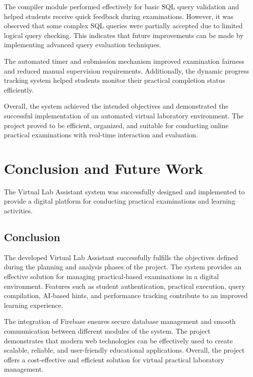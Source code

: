 \documentclass{SSBT-BE}
\begin{document}
The compiler module performed effectively for basic SQL query validation and helped students receive quick feedback during examinations. However, it was observed that some complex SQL queries were partially accepted due to limited logical query checking. This indicates that future improvements can be made by implementing advanced query evaluation techniques.

The automated timer and submission mechanism improved examination fairness and reduced manual supervision requirements. Additionally, the dynamic progress tracking system helped students monitor their practical completion status efficiently.

Overall, the system achieved the intended objectives and demonstrated the successful implementation of an automated virtual laboratory environment. The project proved to be efficient, organized, and suitable for conducting online practical examinations with real-time interaction and evaluation.


\chapter{Conclusion and Future Work}

The Virtual Lab Assistant system was successfully designed and implemented to provide a digital platform for conducting practical examinations and learning activities.

\section*{Conclusion}

The developed Virtual Lab Assistant successfully fulfills the objectives defined during the planning and analysis phases of the project. The system provides an effective solution for managing practical-based examinations in a digital environment. Features such as student authentication, practical execution, query compilation, AI-based hints, and performance tracking contribute to an improved learning experience.

The integration of Firebase ensures secure database management and smooth communication between different modules of the system. The project demonstrates that modern web technologies can be effectively used to create scalable, reliable, and user-friendly educational applications. Overall, the project offers a cost-effective and efficient solution for virtual practical laboratory management.
\end{document}
